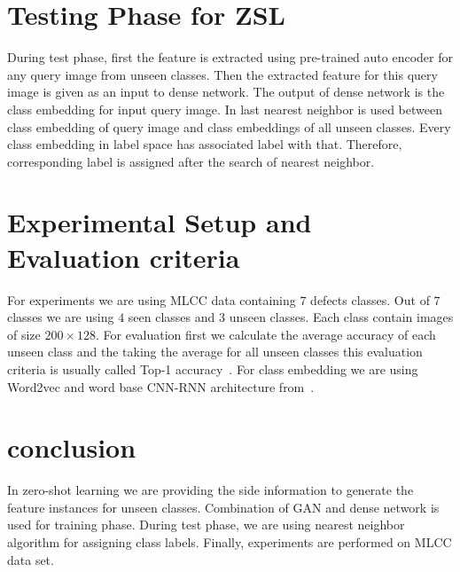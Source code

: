 \documentclass[11pt, conference, english]{IEEEtran}
\theoremstyle{plain}
\theoremstyle{definition}
\theoremstyle{remark}
\begin{document}
	\section{Testing Phase for ZSL}
	During test phase, first the feature is extracted using pre-trained auto encoder for any query image from unseen classes. Then the extracted feature for this query image is given as an input to dense network. The output of dense network is the class embedding for input query image. In last  nearest neighbor is used between class embedding of query image and class embeddings of all unseen classes. Every class embedding in label space has associated label with that. Therefore, corresponding label is assigned after the search of nearest neighbor.
	\section{Experimental Setup and Evaluation criteria}
	For experiments we are using MLCC data containing $7$ defects classes. Out of $7$ classes we are using $4$ seen classes and $3$ unseen classes. Each class contain images of size $200 \times 128$. For evaluation first we calculate the average accuracy of each unseen class and the taking the average for all unseen classes this evaluation criteria is usually called Top-1 accuracy~\cite{scott2016CVPR}. For class embedding we are using Word2vec and word base CNN-RNN architecture from~\cite{scott2016CVPR}.
	\section{conclusion}
	 In zero-shot learning we are providing the side information to generate the feature instances for unseen classes. Combination of GAN and dense network is used for training phase. During test phase, we are using nearest neighbor algorithm for assigning class labels. Finally, experiments are performed on MLCC data set.
		
	
\end{document}
